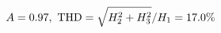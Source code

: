 \documentclass[preview]{standalone}
\begin{document}
\begin{align*}
\special{dvisvgm:raw <g id='unique000'>}A=0.97,\ \text{THD}=\sqrt{H_2^2+H_3^2}/H_1=17.0\%\special{dvisvgm:raw </g>}
\end{align*}
\end{document}
